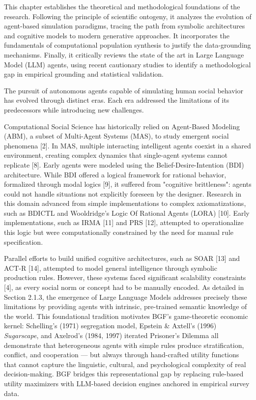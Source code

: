 
This chapter establishes the theoretical and methodological foundations of the research. Following the principle of scientific ontogeny, it analyzes the evolution of agent-based simulation paradigms, tracing the path from symbolic architectures and cognitive models to modern generative approaches. It incorporates the fundamentals of computational population synthesis to justify the data-grounding mechanisms. Finally, it critically reviews the state of the art in Large Language Model (LLM) agents, using recent cautionary studies to identify a methodological gap in empirical grounding and statistical validation.


The pursuit of autonomous agents capable of simulating human social behavior has evolved through distinct eras. Each era addressed the limitations of its predecessors while introducing new challenges.


Computational Social Science has historically relied on Agent-Based Modeling (ABM), a subset of Multi-Agent Systems (MAS), to study emergent social phenomena [2]. In MAS, multiple interacting intelligent agents coexist in a shared environment, creating complex dynamics that single-agent systems cannot replicate [8]. Early agents were modeled using the Belief-Desire-Intention (BDI) architecture. While BDI offered a logical framework for rational behavior, formalized through modal logics [9], it suffered from "cognitive brittleness": agents could not handle situations not explicitly foreseen by the designer. Research in this domain advanced from simple implementations to complex axiomatizations, such as BDICTL and Wooldridge's Logic Of Rational Agents (LORA) [10]. Early implementations, such as IRMA [11] and PRS [12], attempted to operationalize this logic but were computationally constrained by the need for manual rule specification.

Parallel efforts to build unified cognitive architectures, such as SOAR [13] and ACT-R [14], attempted to model general intelligence through symbolic production rules. However, these systems faced significant scalability constraints [4], as every social norm or concept had to be manually encoded. As detailed in Section 2.1.3, the emergence of Large Language Models addresses precisely these limitations by providing agents with intrinsic, pre-trained semantic knowledge of the world. This foundational tradition motivates BGF's game-theoretic economic kernel: Schelling's (1971) segregation model, Epstein \& Axtell's (1996) \textit{Sugarscape}, and Axelrod's (1984, 1997) iterated Prisoner's Dilemma all demonstrate that heterogeneous agents with simple rules produce stratification, conflict, and cooperation — but always through hand-crafted utility functions that cannot capture the linguistic, cultural, and psychological complexity of real decision-making. BGF bridges this representational gap by replacing rule-based utility maximizers with LLM-based decision engines anchored in empirical survey data.

